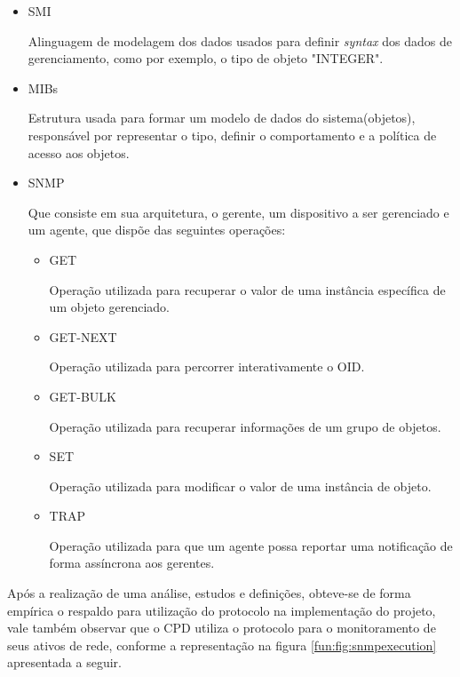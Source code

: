     \begin{itemize}
    \item \acrshort{SMI}
    
    Alinguagem de modelagem dos dados usados para definir \textit{syntax} dos dados de gerenciamento, como por exemplo, o tipo de objeto "INTEGER".
    
    \item \acrshort{MIBs}
    
    Estrutura usada para formar um modelo de dados do sistema(objetos), responsável por representar o tipo, definir o comportamento e a política de acesso aos objetos.
    
    \item \acrshort{SNMP}
    
    Que consiste em sua arquitetura, o gerente, um dispositivo a ser gerenciado e um agente, que dispõe das seguintes operações:
    
        \begin{itemize}
        \item GET
        
        Operação utilizada para recuperar o valor de uma instância específica de um objeto gerenciado.
        
        \item GET-NEXT
        
        Operação utilizada para percorrer interativamente o \acrshort{OID}.
        
        \item GET-BULK
        
        Operação utilizada para recuperar informações de um grupo de objetos.
        \item SET
        
        Operação utilizada para modificar o valor de uma instância de objeto.
        \item TRAP
        
        Operação utilizada para que um agente possa reportar uma notificação de forma assíncrona aos gerentes.
        
        \end{itemize}
        
    \end{itemize}
    
Após a realização de uma análise, estudos e definições, obteve-se de forma empírica o respaldo para utilização do protocolo na implementação do projeto, vale também observar que o \acrshort{CPD} utiliza o protocolo para o monitoramento de seus ativos de rede, conforme a representação na figura \ref{fun:fig:snmpexecution} apresentada a seguir.


